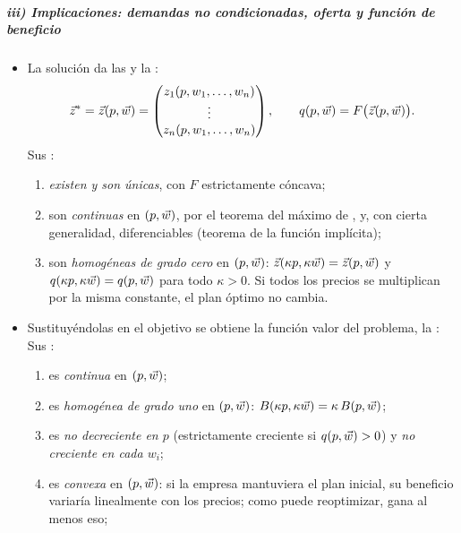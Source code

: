 \documentclass[11pt]{article}
\begin{document}
\subparagraph{iii) Implicaciones: demandas no condicionadas, oferta y función de beneficio}

\begin{itemize}
\item La solución da las  y la :
  \begin{equation}
  \vec{z}^*=\vec{z}(p,\vec{w})=\begin{pmatrix} z_1(p,w_1,\dots,w_n)\\ \vdots\\ z_n(p,w_1,\dots,w_n)\end{pmatrix},\qquad q(p,\vec{w})=F\big(\vec{z}(p,\vec{w})\big). \label{eq:no-condicionadas}
  \end{equation}
  Sus \nocite{MasColellWhinstonGreen1995,Perez2004Microeconomia}:
  \begin{enumerate}
  \item \emph{existen y son únicas}, con $F$ estrictamente cóncava;
  \item son \emph{continuas} en $(p,\vec{w})$, por el teorema del máximo de , y, con cierta generalidad, diferenciables (teorema de la función implícita);
  \item son \emph{homogéneas de grado cero} en $(p,\vec{w})$: $\vec{z}(\kappa p,\kappa\vec{w})=\vec{z}(p,\vec{w})$ y $q(\kappa p,\kappa\vec{w})=q(p,\vec{w})$ para todo $\kappa>0$. Si todos los precios se multiplican por la misma constante, el plan óptimo no cambia.
  \end{enumerate}
\item Sustituyéndolas en el objetivo se obtiene la función valor del problema, la :
  Sus \nocite{MasColellWhinstonGreen1995,Perez2004Microeconomia}:
  \begin{enumerate}
  \item es \emph{continua} en $(p,\vec{w})$;
  \item es \emph{homogénea de grado uno} en $(p,\vec{w})$: $B(\kappa p,\kappa\vec{w})=\kappa\,B(p,\vec{w})$;
  \item es \emph{no decreciente en $p$} (estrictamente creciente si $q(p,\vec{w})>0$) y \emph{no creciente en cada $w_i$};
  \item es \emph{convexa} en $(p,\vec{w})$: si la empresa mantuviera el plan inicial, su beneficio variaría linealmente con los precios; como puede reoptimizar, gana al menos eso;

\end{enumerate}
\end{itemize}
\end{document}
